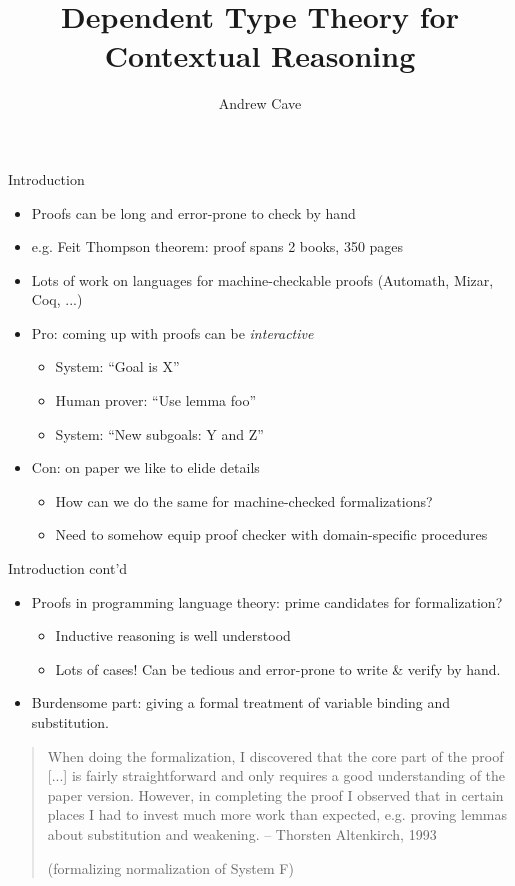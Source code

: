 \documentclass[usenames,dvipsnames]{beamer}
\author{Andrew Cave}
\title[{\makebox[.45\paperwidth]{Dependent Type Theory for Contextual Reasoning\hfill%
       \insertframenumber/\inserttotalframenumber}}]{Dependent Type Theory for Contextual Reasoning}
\begin{document}
\begin{frame}
\titlepage
\end{frame}

\begin{frame}{Introduction}
\begin{itemize}
\item Proofs can be long and error-prone to check by hand
\pause
\item e.g. Feit Thompson theorem: proof spans 2 books, 350 pages
\pause
\item Lots of work on languages for machine-checkable proofs (Automath, Mizar, Coq, ...)
\pause \item {\color{green} Pro:} coming up with proofs can be \emph{interactive}
\begin{itemize}
\item System: ``Goal is X''
\item Human prover: ``Use lemma foo''
\item System: ``New subgoals: Y and Z''
\end{itemize}
\pause \item {\color{red} Con:} on paper we like to elide details
\begin{itemize}
\item How can we do the same for machine-checked formalizations?
\item Need to somehow equip proof checker with domain-specific procedures
\end{itemize}
\end{itemize}
\end{frame}

\begin{frame}{Introduction cont'd}
\begin{itemize}
\item Proofs in programming language theory: prime
candidates for formalization?
\begin{itemize}
\item Inductive reasoning is well understood
\item Lots of cases! Can be
tedious and error-prone to write \& verify by hand.
\end{itemize}
\pause
\item Burdensome part: giving a formal treatment of variable binding and
substitution.
\end{itemize}
\pause
\begin{quote}
When doing the formalization, I discovered that the core part of the
proof [...] is fairly straightforward and
only requires a good understanding of the paper version. However, in
completing the proof I observed that in certain places I had to invest
much more work than expected, e.g. proving lemmas about substitution
and weakening. -- Thorsten Altenkirch, 1993

   (formalizing normalization of System F)
\end{quote}
\end{frame}
\end{document}
